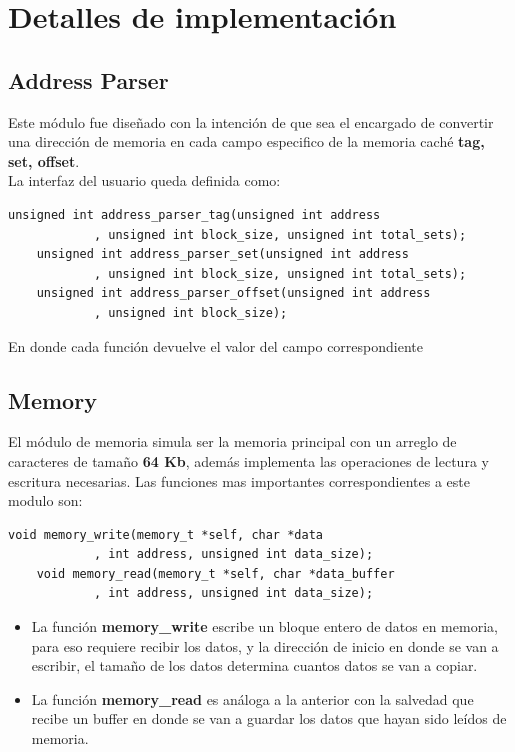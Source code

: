 \documentclass[titlepage,a4paper]{article}
\begin{document}

\section{Detalles de implementación}\label{sec:detalles_implementacion}
\subsection{Address Parser}
    Este módulo fue diseñado con la intención de que sea el encargado de convertir una dirección de memoria en cada campo especifico de la memoria caché \textbf{tag, set, offset}.
    \\ La interfaz del usuario queda definida como:
    \begin{lstlisting}[style=customC]
    unsigned int address_parser_tag(unsigned int address
	        , unsigned int block_size, unsigned int total_sets);
    unsigned int address_parser_set(unsigned int address
        	, unsigned int block_size, unsigned int total_sets);
    unsigned int address_parser_offset(unsigned int address
        	, unsigned int block_size);
    \end{lstlisting}
    En donde cada función devuelve el valor del campo correspondiente

\subsection{Memory}
    El módulo de memoria simula ser la memoria principal con un arreglo de caracteres de tamaño \textbf{64 Kb}, además implementa las operaciones de lectura y escritura necesarias. Las funciones mas importantes correspondientes a este modulo son:
    \begin{lstlisting}[style=customC]
    void memory_write(memory_t *self, char *data
	    	, int address, unsigned int data_size); 
    void memory_read(memory_t *self, char *data_buffer
	    	, int address, unsigned int data_size);
    \end{lstlisting}
    \begin{itemize}
        \item La función \textbf{memory\_write}  escribe un bloque entero de datos en memoria, para eso requiere recibir los datos, y la dirección de inicio en donde se van a escribir, el tamaño de los datos determina cuantos datos se van a copiar.
        \item La función \textbf{memory\_read}  es análoga a la anterior con la salvedad que recibe un buffer en donde se van a guardar los datos que hayan sido leídos de memoria.
    \end{itemize}
\end{document}
